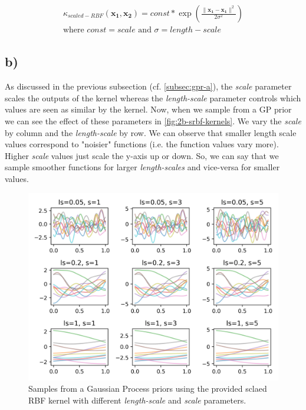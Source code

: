 \documentclass[11pt]{article}
\begin{document}
\begin{gather*}
  \kappa_{scaled-RBF}(\mathbf{x_1},\mathbf{x_2})=const * \exp\left(\frac{\lVert \mathbf{x_1} - \mathbf{x_1} \rVert^2}{2\sigma^2}\right) \\
	\text{where $const = scale$ and $\sigma=length-scale$}
	\label{eq:scaled-rbf-kernel}
\end{gather*}

\subsection{b)}\label{subsec:gpr-b}

As discussed in the previous subsection (cf. \autoref{subsec:gpr-a}), the \textit{scale} parameter scales the outputs of the kernel whereas the \textit{length-scale} parameter controls which values are seen as similar by the kernel. Now, when we sample from a GP prior we can see the effect of these parameters in \autoref{fig:2b-srbf-kernels}. We vary the \textit{scale} by column and the \textit{length-scale} by row. We can observe that smaller length scale values correspond to "noisier" functions (i.e. the function values vary more). Higher \textit{scale} values just scale the y-axis up or down. So, we can say that we sample smoother functions for larger \textit{length-scales} and vice-versa for smaller values.

\begin{figure}[H]
  	\center
  	\includegraphics[width=\columnwidth]{assets/2b-srbf-kernels}
  	\caption{Samples from a Gaussian Process priors using the provided sclaed RBF kernel with different \textit{length-scale} and \textit{scale} parameters.}
  	\label{fig:2b-srbf-kernels}
\end{figure}
\end{document}
